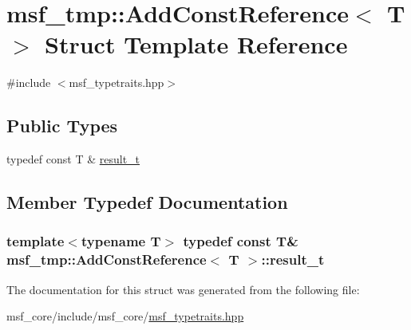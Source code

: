 \hypertarget{structmsf__tmp_1_1AddConstReference}{\section{msf\-\_\-tmp\-:\-:Add\-Const\-Reference$<$ T $>$ Struct Template Reference}
\label{structmsf__tmp_1_1AddConstReference}
}


{\ttfamily \#include $<$msf\-\_\-typetraits.\-hpp$>$}

\subsection*{Public Types}
\begin{DoxyCompactItemize}
\item 
typedef const T \& \hyperlink{structmsf__tmp_1_1AddConstReference_a39b31264ec47bd917d89118bdfea00d7}{result\-\_\-t}
\end{DoxyCompactItemize}


\subsection{Member Typedef Documentation}
\hypertarget{structmsf__tmp_1_1AddConstReference_a39b31264ec47bd917d89118bdfea00d7}{
\subsubsection[{result\-\_\-t}]{\setlength{\rightskip}{0pt plus 5cm}template$<$typename T$>$ typedef const T\& {\bf msf\-\_\-tmp\-::\-Add\-Const\-Reference}$<$ T $>$\-::{\bf result\-\_\-t}}}\label{structmsf__tmp_1_1AddConstReference_a39b31264ec47bd917d89118bdfea00d7}


The documentation for this struct was generated from the following file\-:\begin{DoxyCompactItemize}
\item 
msf\-\_\-core/include/msf\-\_\-core/\hyperlink{msf__typetraits_8hpp}{msf\-\_\-typetraits.\-hpp}\end{DoxyCompactItemize}
